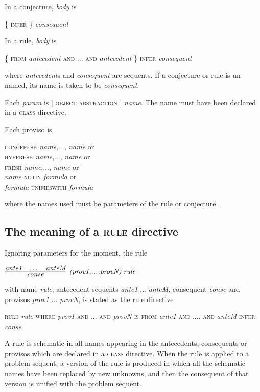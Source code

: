 In a conjecture, \textit{body} is

\{ \textsc{infer \}} \textit{consequent}

In a rule, \textit{body} is

\{ \textsc{from} \textit{antecedent} \textsc{and ... and} \textit{antecedent} \} \textsc{ infer } \textit{consequent}

where \textit{antecedent}s and \textit{consequent} are sequents. If a conjecture or rule is un-named, its name is taken to be \textit{consequent}.

Each \textit{param} is \textsc{[} \textsc{object} {\textbar} \textsc{abstraction} \textsc{]} \textit{name}. The name must have been declared in a \textsc{class} directive. 

Each proviso is

\quad \parbox{200pt}{
\textsc{concfresh} \textit{name},..., \textit{name} or\\
\textsc{hypfresh} \textit{name},..., \textit{name} or\\
\textsc{fresh} \textit{name},..., \textit{name} or\\
\textit{name} \textsc{notin} \textit{formula} or\\
\textit{formula} \textsc{unifieswith} \textit{formula}}

where the names used must be parameters of the rule or conjecture.

\subsection{The meaning of a \textsc{rule} directive}

Ignoring parameters for the moment, the rule

$\infer[\textit{(prov1,...,provN)\;rule}]
       {\textit{conse}}
       {\textit{ante1} & \dots & \textit{anteM}}$

with name \textit{rule}, antecedent sequents \textit{ante1} ... \textit{anteM}, consequent \textit{conse} and provisos \textit{prov1} ... \textit{provN}, is stated as the rule directive

\textsc{rule} \textit{rule} \textsc{where} \textit{prov1} \textsc{and ... and} \textit{provN} \textsc{is from} \textit{ante1} \textsc{and .... and} \textit{anteM} \textsc{ infer } \textit{conse}

A rule is schematic in all names appearing in the antecedents, consequents or provisos which are declared in a \textsc{class} directive. When the rule is applied to a problem sequent, a version of the rule is produced in which all the schematic names have been replaced by new unknowns, and then the consequent of that version is unified with the problem sequent.

